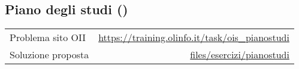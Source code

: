 \subsection{Piano degli studi {()}}
\label{sol pianostudi}
\begin{center}
	\begin{tabularx}{\textwidth}{X r}
		\toprule
		Problema sito OII  & \url{https://training.olinfo.it/task/ois_pianostudi}                        \\
		Soluzione proposta & \ttfamily\href{run:./files/esercizi/pianostudi/}{files/esercizi/pianostudi} \\
		\bottomrule
	\end{tabularx}
\end{center}

